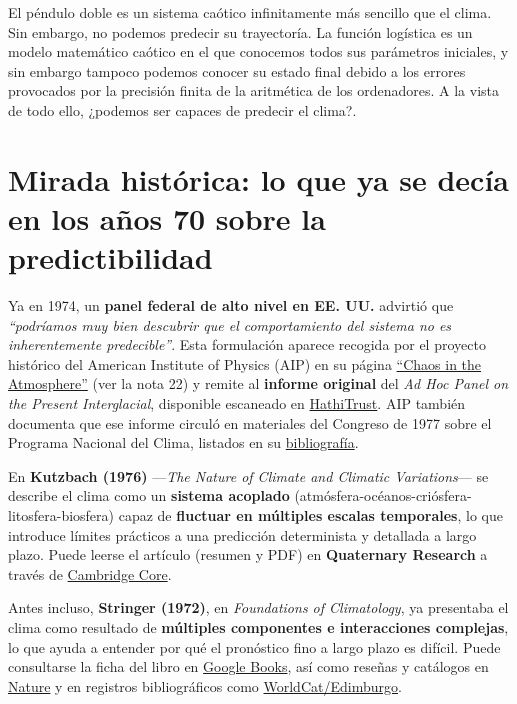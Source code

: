 \documentclass[
  11pt,
  a4paper,
  DIV=11,
  numbers=noendperiod]{scrreprt}
\begin{document}
El péndulo doble es un sistema caótico infinitamente más sencillo que el
clima. Sin embargo, no podemos predecir su trayectoría. La función
logística es un modelo matemático caótico en el que conocemos todos sus
parámetros iniciales, y sin embargo tampoco podemos conocer su estado
final debido a los errores provocados por la precisión finita de la
aritmética de los ordenadores. A la vista de todo ello, ¿podemos ser
capaces de predecir el clima?.

\section{Mirada histórica: lo que ya se decía en los años 70 sobre la
predictibilidad}\label{mirada-histuxf3rica-lo-que-ya-se-decuxeda-en-los-auxf1os-70-sobre-la-predictibilidad}

Ya en 1974, un \textbf{panel federal de alto nivel en EE. UU.} advirtió
que \emph{``podríamos muy bien descubrir que el comportamiento del
sistema no es inherentemente predecible''}. Esta formulación aparece
recogida por el proyecto histórico del American Institute of Physics
(AIP) en su página
\href{https://history.aip.org/climate/chaos.htm}{``Chaos in the
Atmosphere''} (ver la nota 22) y remite al \textbf{informe original} del
\emph{Ad Hoc Panel on the Present Interglacial}, disponible escaneado en
\href{https://babel.hathitrust.org/cgi/pt?id=uc1.31822000471953}{HathiTrust}.
AIP también documenta que ese informe circuló en materiales del Congreso
de 1977 sobre el Programa Nacional del Clima, listados en su
\href{https://history.aip.org/climate/bib.htm}{bibliografía}.

En \textbf{Kutzbach (1976)} ---\emph{The Nature of Climate and Climatic
Variations}--- se describe el clima como un \textbf{sistema acoplado}
(atmósfera-océanos-criósfera-litosfera-biosfera) capaz de
\textbf{fluctuar en múltiples escalas temporales}, lo que introduce
límites prácticos a una predicción determinista y detallada a largo
plazo. Puede leerse el artículo (resumen y PDF) en \textbf{Quaternary
Research} a través de
\href{https://www.cambridge.org/core/services/aop-cambridge-core/content/view/66CAC8CC9924C70498DFFD08287437FB/S0033589400035560a.pdf/nature_of_climate_and_climatic_variations1.pdf}{Cambridge
Core}.

Antes incluso, \textbf{Stringer (1972)}, en \emph{Foundations of
Climatology}, ya presentaba el clima como resultado de \textbf{múltiples
componentes e interacciones complejas}, lo que ayuda a entender por qué
el pronóstico fino a largo plazo es difícil. Puede consultarse la ficha
del libro en
\href{https://books.google.com/books/about/Foundations_of_Climatology_an_Introducti.html?id=_BROwAEACAAJ}{Google
Books}, así como reseñas y catálogos en
\href{https://www.nature.com/articles/239472a0}{Nature} y en registros
bibliográficos como
\href{https://discovered.ed.ac.uk/discovery/fulldisplay?adaptor=Local+Search+Engine&context=L&docid=alma99260793502466&lang=en&tab=Everything&vid=44UOE_INST\%3A44UOE_VU2}{WorldCat/Edimburgo}.
\end{document}
